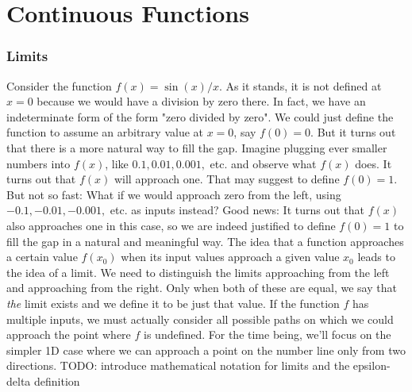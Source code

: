 \section{Continuous Functions}

\subsubsection{Limits}
Consider the function $f(x) = \sin (x) / x$. As it stands, it is not defined at $x = 0$ because we would have a division by zero there. In fact, we have an indeterminate form of the form "zero divided by zero". We could just define the function to assume an arbitrary value at $x = 0$, say $f(0) = 0$. But it turns out that there is a more natural way to fill the gap. Imagine plugging ever smaller numbers into $f(x)$, like $0.1, 0.01, 0.001, $ etc. and observe what $f(x)$ does. It turns out that $f(x)$ will approach one. That may suggest to define $f(0) = 1$. But not so fast: What if we would approach zero from the left, using $-0.1, -0.01, -0.001,$ etc. as inputs instead? Good news: It turns out that $f(x)$ also approaches one in this case, so we are indeed justified to define $f(0)=1$ to fill the gap in a natural and meaningful way. The idea that a function approaches a certain value $f(x_0)$ when its input values approach a given value $x_0$ leads to the idea of a limit. We need to distinguish the limits approaching from the left and approaching from the right. Only when both of these are equal, we say that \emph{the} limit exists and we define it to be just that value. If the function $f$ has multiple inputs, we must actually consider all possible paths on which we could approach the point where $f$ is undefined. For the time being, we'll focus on the simpler 1D case where we can approach a point on the number line only from two directions.
TODO: introduce mathematical notation for limits and the epsilon-delta definition





